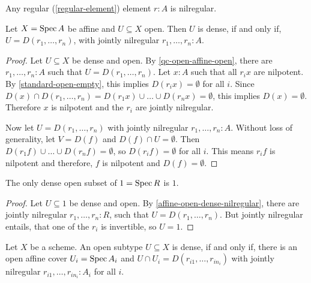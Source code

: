 \begin{proposition}
  Any regular (\cref{regular-element}) element $r:A$ is nilregular.
\end{proposition}

\begin{lemma}%
  \label{affine-open-dense-nilregular}
  Let $X=\operatorname{Spec} A$ be affine and $U\subseteq X$ open.
  Then $U$ is dense, if and only if,
  $U=D(r_1,\dots,r_n)$, with jointly nilregular $r_1,\dots,r_n:A$.
\end{lemma}

\begin{proof}
  Let $U\subseteq X$ be dense and open.
  By \cref{qc-open-affine-open}, there are $r_1,\dots,r_n:A$ such that $U=D(r_1,\dots,r_n)$.
  Let $x:A$ such that all $r_ix$ are nilpotent.
  By \cref{standard-open-empty}, this implies $D(r_ix)=\emptyset$ for all $i$.
  Since $D(x)\cap D(r_1,\dots,r_n)=D(r_1x)\cup\dots\cup D(r_nx)=\emptyset$,
  this implies $D(x)=\emptyset$.
  Therefore $x$ is nilpotent and the $r_i$ are jointly nilregular.

  Now let $U=D(r_1,\dots,r_n)$ with jointly nilregular $r_1,\dots,r_n:A$.
  Without loss of generality, let $V=D(f)$ and $D(f)\cap U=\emptyset$.
  Then $D(r_1f)\cup \dots \cup D(r_nf)=\emptyset$, so $D(r_if)=\emptyset$ for all $i$.
  This means $r_if$ is nilpotent and therefore, $f$ is nilpotent and $D(f)=\emptyset$.
\end{proof}

\begin{corollary}%
  The only dense open subset of $1=\operatorname{Spec} R$ is $1$.
\end{corollary}

\begin{proof}
  Let $U\subseteq 1$ be dense and open.
  By \cref{affine-open-dense-nilregular},
  there are jointly nilregular $r_1,\dots,r_n:R$,
  such that $U=D(r_1,\dots,r_n)$.
  But jointly nilregular entails,
  that one of the $r_i$ is invertible, so $U=1$.
\end{proof}

\begin{theorem}%
  \label{dense-is-jointly-nilregular}
  Let $X$ be a scheme.
  An open subtype $U\subseteq X$ is dense,
  if and only if, there is an open affine cover $U_i=\operatorname{Spec} A_i$
  and $U\cap U_i=D(r_{i1},\dots,r_{in_i})$ with jointly nilregular $r_{i1},\dots,r_{in_i}:A_i$ for all $i$.
\end{theorem}

